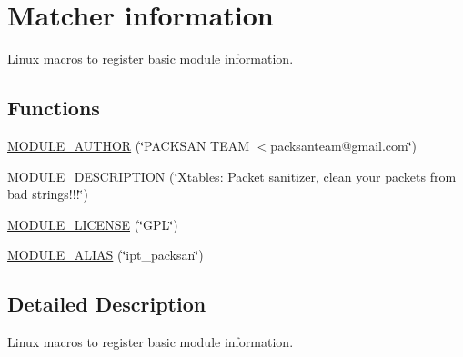 \hypertarget{group__mt__info}{
\section{Matcher information}
\label{group__mt__info}
}


Linux macros to register basic module information.  


\subsection*{Functions}
\begin{DoxyCompactItemize}
\item 
\hyperlink{group__mt__info_ga951bcda00d8a487070fd7be5c363d943}{MODULE\_\-AUTHOR} (\char`\"{}PACKSAN TEAM $<$packsanteam@gmail.com\char`\"{})
\item 
\hyperlink{group__mt__info_ga7884adf036695ba839028e1d0f7e8d17}{MODULE\_\-DESCRIPTION} (\char`\"{}Xtables: Packet sanitizer, clean your packets from bad strings!!!\char`\"{})
\item 
\hyperlink{group__mt__info_gad94b36675e7eb067ea3ce6ff9e244a44}{MODULE\_\-LICENSE} (\char`\"{}GPL\char`\"{})
\item 
\hyperlink{group__mt__info_gae1143a6664694334dd30c6e934afafe8}{MODULE\_\-ALIAS} (\char`\"{}ipt\_\-packsan\char`\"{})
\end{DoxyCompactItemize}


\subsection{Detailed Description}
Linux macros to register basic module information. 

